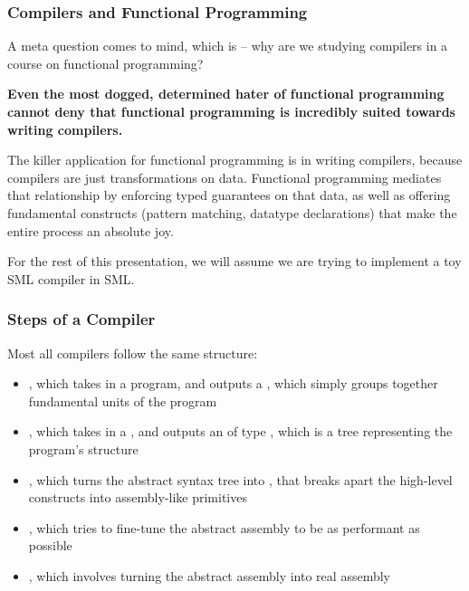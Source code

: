 \documentclass[aspectratio=169]{beamer}
\begin{document}
\begin{frame}[fragile]
  \frametitle{Compilers and Functional Programming}

  A meta question comes to mind, which is -- why are we studying compilers in
  a course on functional programming?

  \vspace{\fill}

  \textbf{Even the most dogged, determined hater of functional programming cannot deny
  that functional programming is incredibly suited towards writing compilers.
  }

  \vspace{\fill}

  The killer application for functional programming is in writing compilers, because
  compilers are just transformations on data. Functional programming mediates that
  relationship by enforcing typed guarantees on that data, as well as offering
  fundamental constructs (pattern matching, datatype declarations) that make
  the entire process an absolute joy.

  \vspace{\fill}

  For the rest of this presentation, we will assume we are trying to implement
  a toy SML compiler in SML.
\end{frame}


\begin{frame}[fragile]
  \frametitle{Steps of a Compiler}

  Most all compilers follow the same structure:
  \begin{itemize}
    \item {}, which takes in a  program, and outputs a
    , which simply groups together fundamental units of the program
    \item {}, which takes in a , and outputs an
     of type , which is a tree representing
    the program's structure
    \item {}, which turns the abstract
    syntax tree into , that breaks apart the high-level
    constructs into assembly-like primitives
    \item {}, which tries to fine-tune the abstract assembly to
    be as performant as possible
    \item {}, which involves turning the abstract assembly
    into real assembly
  \end{itemize}
\end{frame}
\end{document}
